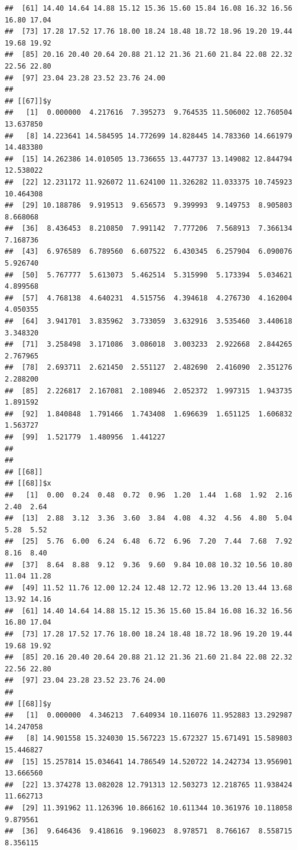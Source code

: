\documentclass[
  ignorenonframetext,
]{beamer}
\begin{document}
\begin{frame}[fragile]{}
\begin{verbatim}
##  [61] 14.40 14.64 14.88 15.12 15.36 15.60 15.84 16.08 16.32 16.56 16.80 17.04
##  [73] 17.28 17.52 17.76 18.00 18.24 18.48 18.72 18.96 19.20 19.44 19.68 19.92
##  [85] 20.16 20.40 20.64 20.88 21.12 21.36 21.60 21.84 22.08 22.32 22.56 22.80
##  [97] 23.04 23.28 23.52 23.76 24.00
## 
## [[67]]$y
##   [1]  0.000000  4.217616  7.395273  9.764535 11.506002 12.760504 13.637850
##   [8] 14.223641 14.584595 14.772699 14.828445 14.783360 14.661979 14.483380
##  [15] 14.262386 14.010505 13.736655 13.447737 13.149082 12.844794 12.538022
##  [22] 12.231172 11.926072 11.624100 11.326282 11.033375 10.745923 10.464308
##  [29] 10.188786  9.919513  9.656573  9.399993  9.149753  8.905803  8.668068
##  [36]  8.436453  8.210850  7.991142  7.777206  7.568913  7.366134  7.168736
##  [43]  6.976589  6.789560  6.607522  6.430345  6.257904  6.090076  5.926740
##  [50]  5.767777  5.613073  5.462514  5.315990  5.173394  5.034621  4.899568
##  [57]  4.768138  4.640231  4.515756  4.394618  4.276730  4.162004  4.050355
##  [64]  3.941701  3.835962  3.733059  3.632916  3.535460  3.440618  3.348320
##  [71]  3.258498  3.171086  3.086018  3.003233  2.922668  2.844265  2.767965
##  [78]  2.693711  2.621450  2.551127  2.482690  2.416090  2.351276  2.288200
##  [85]  2.226817  2.167081  2.108946  2.052372  1.997315  1.943735  1.891592
##  [92]  1.840848  1.791466  1.743408  1.696639  1.651125  1.606832  1.563727
##  [99]  1.521779  1.480956  1.441227
## 
## 
## [[68]]
## [[68]]$x
##   [1]  0.00  0.24  0.48  0.72  0.96  1.20  1.44  1.68  1.92  2.16  2.40  2.64
##  [13]  2.88  3.12  3.36  3.60  3.84  4.08  4.32  4.56  4.80  5.04  5.28  5.52
##  [25]  5.76  6.00  6.24  6.48  6.72  6.96  7.20  7.44  7.68  7.92  8.16  8.40
##  [37]  8.64  8.88  9.12  9.36  9.60  9.84 10.08 10.32 10.56 10.80 11.04 11.28
##  [49] 11.52 11.76 12.00 12.24 12.48 12.72 12.96 13.20 13.44 13.68 13.92 14.16
##  [61] 14.40 14.64 14.88 15.12 15.36 15.60 15.84 16.08 16.32 16.56 16.80 17.04
##  [73] 17.28 17.52 17.76 18.00 18.24 18.48 18.72 18.96 19.20 19.44 19.68 19.92
##  [85] 20.16 20.40 20.64 20.88 21.12 21.36 21.60 21.84 22.08 22.32 22.56 22.80
##  [97] 23.04 23.28 23.52 23.76 24.00
## 
## [[68]]$y
##   [1]  0.000000  4.346213  7.640934 10.116076 11.952883 13.292987 14.247058
##   [8] 14.901558 15.324030 15.567223 15.672327 15.671491 15.589803 15.446827
##  [15] 15.257814 15.034641 14.786549 14.520722 14.242734 13.956901 13.666560
##  [22] 13.374278 13.082028 12.791313 12.503273 12.218765 11.938424 11.662713
##  [29] 11.391962 11.126396 10.866162 10.611344 10.361976 10.118058  9.879561
##  [36]  9.646436  9.418616  9.196023  8.978571  8.766167  8.558715  8.356115

\end{verbatim}
\end{frame}
\end{document}
